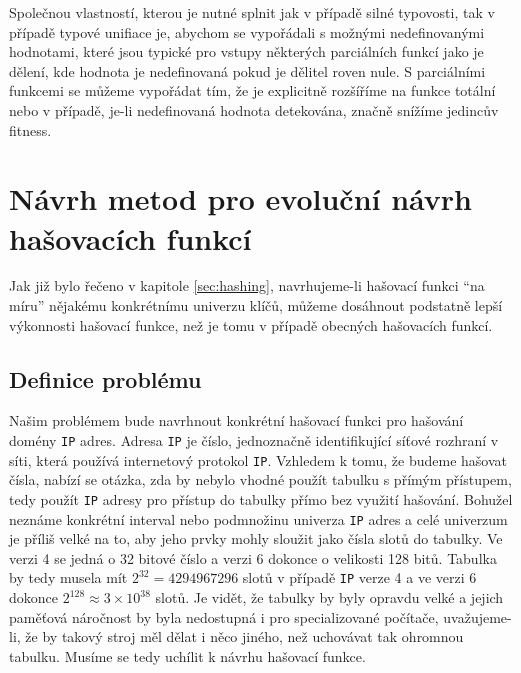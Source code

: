 Společnou vlastností, kterou je nutné splnit jak v případě silné typovosti, tak v případě
typové unifiace je, abychom se vypořádali s možnými
nedefinovanými hodnotami, které jsou typické pro vstupy některých parciálních funkcí
jako je dělení, kde hodnota je nedefinovaná pokud je dělitel roven nule.
S parciálními funkcemi se můžeme vypořádat tím, že je explicitně rozšíříme na funkce
totální nebo v případě, je-li nedefinovaná hodnota detekována, značně snížíme jedincův 
fitness.

\chapter{Návrh metod pro evoluční návrh hašovacích funkcí}
\label{sec:solution_design}

Jak již bylo řečeno v kapitole \ref{sec:hashing}, navrhujeme-li hašovací funkci ``na
míru'' nějakému konkrétnímu univerzu klíčů, můžeme dosáhnout podstatně lepší 
výkonnosti hašovací funkce, než je tomu v případě obecných hašovacích funkcí.

\section{Definice problému}
Našim problémem bude navrhnout konkrétní hašovací funkci pro hašování domény
\texttt{IP} adres. Adresa \texttt{IP} je číslo, jednoznačně identifikující síťové
rozhraní v síti, která používá internetový protokol \texttt{IP}. Vzhledem k tomu,
že budeme hašovat čísla, nabízí se otázka, zda by nebylo vhodné použít tabulku
s přímým přístupem, tedy použít \texttt{IP} adresy pro přístup do tabulky
přímo bez využití hašování. Bohužel neznáme konkrétní interval nebo podmnožinu
univerza \texttt{IP} adres a celé univerzum je příliš velké na to, aby jeho 
prvky mohly sloužit jako čísla slotů do tabulky. Ve verzi 4 se jedná o 32 
bitové číslo a verzi 6 dokonce o velikosti 128 bitů. Tabulka by tedy musela
mít $2^{32} = 4 294 967 296$ slotů v případě  \texttt{IP} verze 4 a ve verzi 6
dokonce $2^{128} \approx 3 \times 10^{38}$
slotů. Je vidět, že tabulky by byly opravdu velké a jejich paměťová náročnost
by byla nedostupná i pro specializované počítače, uvažujeme-li, že by takový
stroj měl dělat i něco jiného, než uchovávat tak ohromnou tabulku. Musíme se
tedy uchílit k návrhu hašovací funkce.

